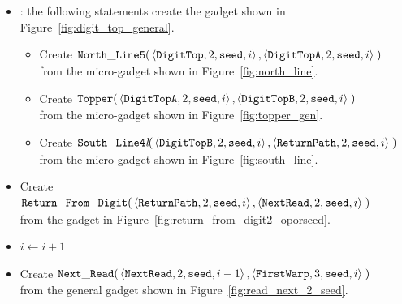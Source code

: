 \begin{itemize}
    \item {\dtop}: the following statements create the gadget shown in Figure~\ref{fig:digit_top_general}.
    \begin{itemize}
        \item Create
        $\begin{aligned}[t]
            {\tt North\_Line5}(& \left \langle {\tt DigitTop},  2, {\tt seed} , i \right\rangle,
                                 \left \langle {\tt DigitTopA}, 2, {\tt seed} , i \right\rangle \;)
        \end{aligned}$\\ from the micro-gadget shown in Figure~\ref{fig:north_line}.

        \item Create
        $\begin{aligned}[t]
            {\tt Topper}(& \left \langle {\tt DigitTopA}, 2, {\tt seed}, i \right\rangle,
                           \left \langle {\tt DigitTopB}, 2, {\tt seed}, i \right\rangle \;)
        \end{aligned}$\\ from the micro-gadget shown in Figure~\ref{fig:topper_gen}.

        \item Create
        $\begin{aligned}[t]
            {\tt South\_Line4\textit{l}}(&\left\langle {\tt DigitTopB}, 2, {\tt seed}, i \right\rangle,
                                          \left\langle {\tt ReturnPath},     2, {\tt seed}, i \right\rangle \;)
        \end{aligned}$\\ from the micro-gadget shown in Figure~\ref{fig:south_line}.
    \end{itemize}


    \item Create
    $\begin{aligned}[t]
        {\tt Return\_From\_Digit}(&\left\langle {\tt ReturnPath},    2, {\tt seed}, i \right\rangle,
                          \left\langle {\tt NextRead}, 2, {\tt seed}, i \right\rangle \;)
    \end{aligned}$\\ from the gadget in Figure~\ref{fig:return_from_digit2_oporseed}.

    \item $i \gets i + 1$

    \item Create
    $\begin{aligned}[t]
        {\tt Next\_Read}(&\left\langle {\tt NextRead},  2, {\tt seed}, i - 1 \right\rangle,
                   \left\langle {\tt FirstWarp}, 3, {\tt seed}, i     \right\rangle \;)
    \end{aligned}$\\ from the general gadget shown in Figure~\ref{fig:read_next_2_seed}.


\end{itemize}
